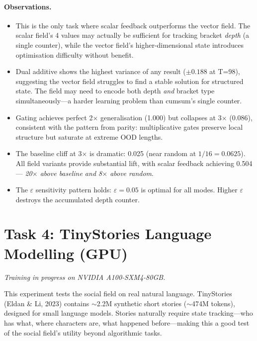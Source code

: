 \documentclass[11pt,a4paper]{article}
\begin{document}
\paragraph{Observations.}
\begin{itemize}
    \item This is the only task where scalar feedback outperforms the
          vector field.  The scalar field's 4 values may actually
          be sufficient for tracking bracket \emph{depth} (a single
          counter), while the vector field's higher-dimensional
          state introduces optimisation difficulty without benefit.

    \item Dual additive shows the highest variance of any result
          ($\pm 0.188$ at T=98), suggesting the vector field
          struggles to find a stable solution for structured state.
          The field may need to encode both depth \emph{and} bracket
          type simultaneously---a harder learning problem than
          cumsum's single counter.

    \item Gating achieves perfect 2$\times$ generalisation (1.000)
          but collapses at 3$\times$ (0.086), consistent with the
          pattern from parity: multiplicative gates preserve local
          structure but saturate at extreme OOD lengths.

    \item The baseline cliff at 3$\times$ is dramatic: 0.025 (near
          random at $1/16 = 0.0625$).  All field variants provide
          substantial lift, with scalar feedback achieving 0.504---
          \emph{20$\times$ above baseline and 8$\times$ above random}.

    \item The $\varepsilon$ sensitivity pattern holds: $\varepsilon
          = 0.05$ is optimal for all modes.  Higher $\varepsilon$
          destroys the accumulated depth counter.
\end{itemize}


\section{Task 4: TinyStories Language Modelling (GPU)}

\emph{Training in progress on NVIDIA A100-SXM4-80GB.}

This experiment tests the social field on real natural language.
TinyStories (Eldan \& Li, 2023) contains $\sim$2.2M synthetic
short stories ($\sim$474M tokens), designed for small language
models.  Stories naturally require state tracking---who has what,
where characters are, what happened before---making this a good
test of the social field's utility beyond algorithmic tasks.
\end{document}
